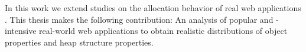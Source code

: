 In this work we extend studies on the allocation behavior of real \JS web
applications \cite{JSMeter2009}. This thesis makes the following contribution:
An analysis of popular and \JS-intensive real-world web applications to obtain
realistic distributions of object properties and heap structure properties.

